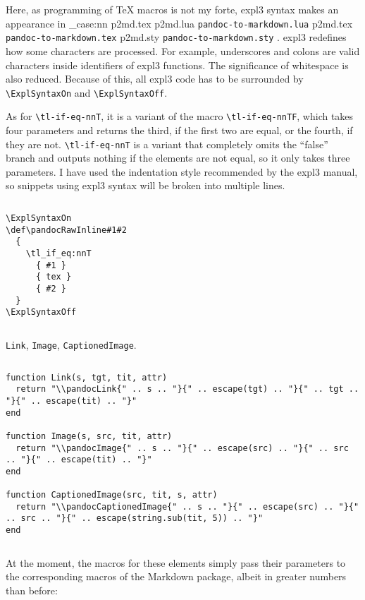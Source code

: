 \documentclass[
  digital,     %
  oneside,     %
  nosansbold,  %
  nocolorbold, %
  lof,         %
  lot,         %
]{fithesis4}
\newcommand\macro[1]{\texttt{\textbackslash{}{#1}}}
\newcommand\file[1]
  {
    \str_case:nn
      { #1 }
      {
        { p2md.lua } { \texttt{pandoc\hyp{}to\hyp{}markdown.lua} }
        { p2md.tex } { \texttt{pandoc\hyp{}to\hyp{}markdown.tex} }
        { p2md.sty } { \texttt{pandoc\hyp{}to\hyp{}markdown.sty} }
      }
  }
\begin{document}
Here, as programming of \TeX{} macros is not my forte, expl3 syntax makes an appearance in \file{p2md.tex}. expl3 redefines how some characters are processed. For example, underscores and colons are valid characters inside identifiers of expl3 functions. The significance of whitespace is also reduced. Because of this, all expl3 code has to be surrounded by \macro{ExplSyntaxOn} and \macro{ExplSyntaxOff}.

As for \macro{tl-if-eq-nnT}, it is a variant of the macro \macro{tl-if-eq-nnTF}, which takes four parameters and returns the third, if the first two are equal, or the fourth, if they are not. \macro{tl-if-eq-nnT} is a variant that completely omits the ``false'' branch and outputs nothing if the elements are not equal, so it only takes three parameters. I have used the indentation style recommended by the expl3 manual, so snippets using expl3 syntax will be broken into multiple lines.

$ $

\noindent
\lstset{language=[plain]TeX}
\begin{lstlisting}
\ExplSyntaxOn
\def\pandocRawInline#1#2
  {
    \tl_if_eq:nnT
      { #1 }
      { tex }
      { #2 }
  }
\ExplSyntaxOff
\end{lstlisting}

$ $

\noindent
\texttt{Link}, \texttt{Image}, \texttt{CaptionedImage}.

$ $

\noindent
\lstset{language=[5.3]Lua}
\begin{lstlisting}
function Link(s, tgt, tit, attr)
  return "\\pandocLink{" .. s .. "}{" .. escape(tgt) .. "}{" .. tgt .. "}{" .. escape(tit) .. "}"
end

function Image(s, src, tit, attr)
  return "\\pandocImage{" .. s .. "}{" .. escape(src) .. "}{" .. src .. "}{" .. escape(tit) .. "}"
end

function CaptionedImage(src, tit, s, attr)
  return "\\pandocCaptionedImage{" .. s .. "}{" .. escape(src) .. "}{" .. src .. "}{" .. escape(string.sub(tit, 5)) .. "}"
end
\end{lstlisting}

$ $

\noindent
At the moment, the macros for these elements simply pass their parameters to the corresponding macros of the Markdown package, albeit in greater numbers than before:
\end{document}
